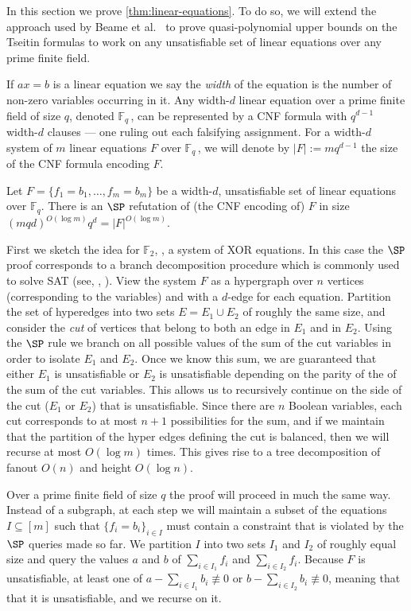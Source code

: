 \documentclass{toc}
\begin{document}
In this section we prove \autoref{thm:linear-equations}. 
To do so, we will extend the approach used by Beame et al.~\cite{BeameFIKPPR18} to prove quasi-polynomial upper bounds on the Tseitin formulas to work on any unsatisfiable set of linear equations over any prime finite field. 

If $ax = b$ is a linear equation we say the \emph{width} of the equation is the number of non-zero variables occurring in it.
Any width-$d$ linear equation over a prime finite field of size $q$, denoted $\mathbb{F}_q\,$, can be represented by a CNF formula with $q^{d-1}$ width-$d$ clauses --- one ruling out each falsifying assignment.
For a width-$d$ system of $m$ linear equations $F$ over $\mathbb{F}_q\,$, we will denote by $|F| := mq^{d-1}$ the size of the CNF formula encoding $F$. 

\begin{theorem}\label{thm:SP_gaussian_elim}
	Let $F = \{f_1 = b_1, \ldots, f_m = b_m \}$ be a width-$d$, unsatisfiable set of linear equations over $\mathbb{F}_q$.
	There is an $\SP$ refutation of (the CNF encoding of) $F$ in size $(mqd)^{O(\log m)}q^d = |F|^{O(\log m)}$.
\end{theorem}

First we sketch the idea for $\mathbb{F}_2$, \ie,  a system of XOR equations.
In this case the $\SP$ proof corresponds to a branch decomposition procedure which is commonly used to solve SAT (see, \eg, \cite{LodhaOS19,AlekhnovichR02,Dechter96,Darwiche01}). 
View the system $F$ as a hypergraph over $n$ vertices (corresponding to the variables) and with a $d$-edge for each equation. 
Partition the set of hyperedges into two sets $E = E_1 \cup E_2$ of roughly the same size, and consider the \emph{cut} of vertices that belong to both an edge in $E_1$ and in $E_2$. 
Using the $\SP$ rule we branch on all possible values of the sum of the cut variables in order to isolate $E_1$ and $E_2$. 
Once we know this sum, we are guaranteed that either $E_1$ is unsatisfiable or $E_2$ is unsatisfiable depending on the parity of the of the sum of the cut variables. 
This allows us to recursively continue on the side of the cut ($E_1$ or $E_2$) that is unsatisfiable. 
Since there are $n$ Boolean variables, each cut corresponds to at most $n+1$ possibilities for the sum, and if we maintain that the partition of the hyper edges defining the cut is balanced, then we will recurse at most $O(\log m)$ times. 
This gives rise to a tree decomposition of fanout $O(n)$ and height $O(\log n)$.

Over a prime finite field of size $q$ the proof will proceed in much the same way. 
Instead of a subgraph, at each step we will maintain a subset of the equations $I \subseteq [m]$ such that $\{f_i =b_i \}_{i \in I}$ must contain a constraint that is violated by the $\SP$ queries made so far. We partition $I$ into two sets $I_1$ and $I_2$ of roughly equal size and query the values $a$ and $b$ of $\sum_{i \in I_1} f_i$ and $\sum_{i \in I_2} f_i$. Because $F$ is unsatisfiable, at least one of $a- \sum_{i \in I_1} b_i \not \equiv 0$ or $b- \sum_{i \in I_2} b_i \not \equiv 0$, meaning that that it is unsatisfiable, and we recurse on it. 
\end{document}
